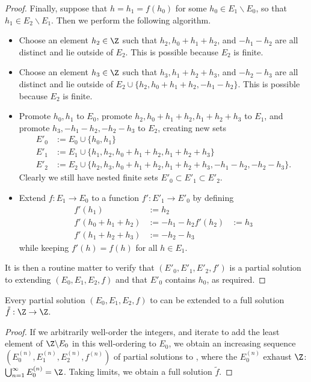\begin{proof}
Finally, suppose that $h = h_1 = f(h_0)$ for some $h_0 \in E_1 \backslash E_0$, so that $h_1 \in E_2 \backslash E_1$.  Then we perform the following algorithm.
\begin{itemize}
  \item Choose an element $h_2 \in \Z$ such that $h_2, h_0+h_1+h_2$, and $-h_1-h_2$ are all distinct and lie outside of $E_2$.  This is possible because $E_2$ is finite.
  \item Choose an element $h_3 \in \Z$ such that $h_3, h_1+h_2+h_3$, and $-h_2-h_3$ are all distinct and lie outside of $E_2 \cup \{h_2, h_0+h_1+h_2,-h_1-h_2\}$.  This is possible because $E_2$ is finite.
  \item Promote $h_0, h_1$ to $E_0$, promote $h_2, h_0+h_1+h_2, h_1+h_2+h_3$ to $E_1$, and promote $h_3, -h_1-h_2,-h_2-h_3$ to $E_2$, creating new sets
\begin{align*}
  E'_0 &:= E_0 \cup \{h_0, h_1 \}\\
  E'_1 &:= E_1 \cup \{h_1, h_2, h_0+h_1+h_2, h_1+h_2+h_3 \}\\
  E'_2 &:= E_2 \cup \{h_2, h_3, h_0+h_1+h_2, h_1+h_2+h_3, -h_1-h_2, -h_2-h_3\}.
\end{align*}
Clearly we still have nested finite sets $E'_0 \subset E'_1 \subset E'_2$.
\item Extend $f : E_1 \to E_0$ to a function $f': E'_1 \to E'_0$ by defining
\begin{align*}
  f'(h_1) &:= h_2 \\
  f'(h_0+h_1+h_2) &:= -h_1-h_2
  f'(h_2) &:= h_3 \\
  f'(h_1+h_2+h_3) &:= -h_2-h_3
\end{align*}
while keeping $f'(h)=f(h)$ for all $h \in E_1$.
\end{itemize}
It is then a routine matter to verify that $(E'_0,E'_1,E'_2,f')$ is a partial solution to  extending $(E_0,E_1,E_2,f)$ and that $E'_0$ contains $h_0$, as required.
\end{proof}

\begin{corollary} \label{extend} Every partial solution $(E_0,E_1,E_2,f)$ to  can be extended to a full solution $\tilde f: \Z \to \Z$.
\end{corollary}

\begin{proof}
  If we arbitrarily well-order the integers, and iterate  to add the least element of $\Z \backslash E_0$ in this well-ordering to $E_0$, we obtain an increasing sequence $(E^{(n)}_0, E^{(n)}_1, E^{(n)}_2, f^{(n)})$ of partial solutions to , where the $E^{(n)}_0$ exhaust $\Z$: $\bigcup_{n=1}^\infty E^{(n)}_0 = \Z$.  Taking limits, we obtain a full solution $\tilde f$.
\end{proof}

